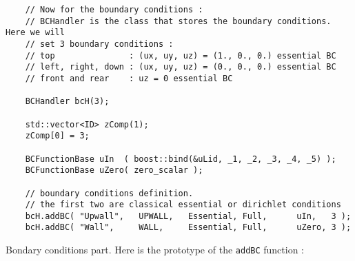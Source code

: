 \begin{verbatim}
    // Now for the boundary conditions :
    // BCHandler is the class that stores the boundary conditions. Here we will
    // set 3 boundary conditions :
    // top               : (ux, uy, uz) = (1., 0., 0.) essential BC
    // left, right, down : (ux, uy, uz) = (0., 0., 0.) essential BC
    // front and rear    : uz = 0 essential BC

    BCHandler bcH(3);

    std::vector<ID> zComp(1);
    zComp[0] = 3;

    BCFunctionBase uIn  ( boost::bind(&uLid, _1, _2, _3, _4, _5) );
    BCFunctionBase uZero( zero_scalar );

    // boundary conditions definition.
    // the first two are classical essential or dirichlet conditions
    bcH.addBC( "Upwall",   UPWALL,   Essential, Full,      uIn,   3 );
    bcH.addBC( "Wall",     WALL,     Essential, Full,      uZero, 3 );
\end{verbatim}

Bondary conditions  part. Here is the prototype of the \verb!addBC! function :

